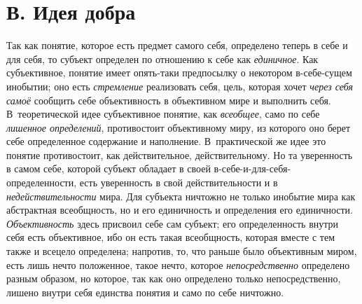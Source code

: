 \section[В. Идея добра]{В. Идея добра}
Так как понятие, которое есть предмет самого себя, определено
теперь в себе и для себя, то субъект определен по отношению к себе как
{\em единичное}. Как
субъективное, понятие имеет опять-таки предпосылку о некотором в-себе-сущем
инобытии; оно есть {\em стремление}
реализовать себя, цель, которая хочет
{\em через себя самоё}
сообщить себе объективность в объективном мире и выполнить
себя. В~теоретической идее субъективное понятие, как
{\em всеобщее}, само по
себе {\em лишенное определений},
противостоит объективному миру, из которого оно берет себе
определенное содержание и наполнение. В~практической же идее это понятие
противостоит, как действительное, действительному. Но та уверенность в
самом себе, которой субъект обладает в своей
в-себе-и-для-себя-определенности, есть уверенность в свой действительности
и в {\em недействительности}
мира. Для субъекта ничтожно не только инобытие мира как
абстрактная всеобщность, но и его единичность и определения его
единичности. {\em Объективность}
здесь присвоил себе сам субъект; его определенность внутри
себя есть объективное, ибо он есть такая всеобщность, которая вместе с тем
также и всецело определена; напротив, то, что раньше было объективным
миром, есть лишь нечто положенное, такое нечто, которое
{\em непосредственно}
определено разным образом, но которое, так как оно определено
только непосредственно, лишено внутри себя единства понятия и само по себе
ничтожно.

